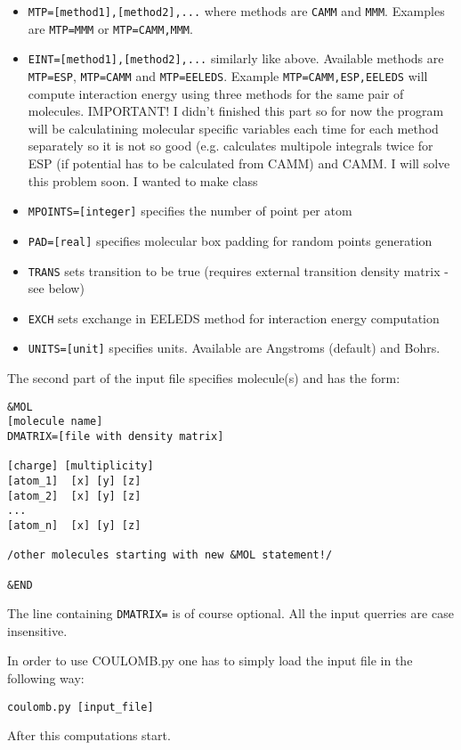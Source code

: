 \documentclass[a4paper,titlepage,twoside,fleqn]{article}
\begin{document}
\begin{itemize}
\item \verb+MTP=[method1],[method2],...+ where methods are 
      \verb+CAMM+ and \verb+MMM+. Examples are \verb+MTP=MMM+ 
      or \verb+MTP=CAMM,MMM+.
\item \verb+EINT=[method1],[method2],...+ similarly like above. 
      Available methods are \verb+MTP=ESP+, \verb+MTP=CAMM+ and
      \verb+MTP=EELEDS+. Example \verb+MTP=CAMM,ESP,EELEDS+ 
      will compute interaction energy using three methods for 
      the same pair of molecules. {\color{red}IMPORTANT! I didn't
      finished this part so for now the program will be calculatining
      molecular specific variables each time for each method separately
      so it is not so good (e.g. calculates multipole integrals twice 
      for ESP (if potential has to be calculated from CAMM) and CAMM. 
      I will solve this problem soon. I wanted to make class \verb++}
\item \verb+MPOINTS=[integer]+ specifies the number of point per atom
\item \verb+PAD=[real]+ specifies molecular box padding for random 
      points generation
\item \verb+TRANS+ sets transition to be true (requires external 
      transition density matrix - see below)
\item \verb+EXCH+ sets exchange in EELEDS method for interaction
      energy computation
\item \verb+UNITS=[unit]+ specifies units. Available are Angstroms 
      (default) and Bohrs. 
\end{itemize}

The second part of the input file specifies molecule(s)
and has the form:
\begin{verbatim}
&MOL
[molecule name]
DMATRIX=[file with density matrix]

[charge] [multiplicity]
[atom_1]  [x] [y] [z]
[atom_2]  [x] [y] [z]
...
[atom_n]  [x] [y] [z]

/other molecules starting with new &MOL statement!/

&END
\end{verbatim}
The line containing \verb+DMATRIX=+ is of course optional. 
All the input querries are {\rm case insensitive}.  

In order to use {\sc COULOMB.py} one has to simply load the input
file in the following way:
\begin{verbatim}
coulomb.py [input_file]
\end{verbatim}
After this computations start.
\end{document}
